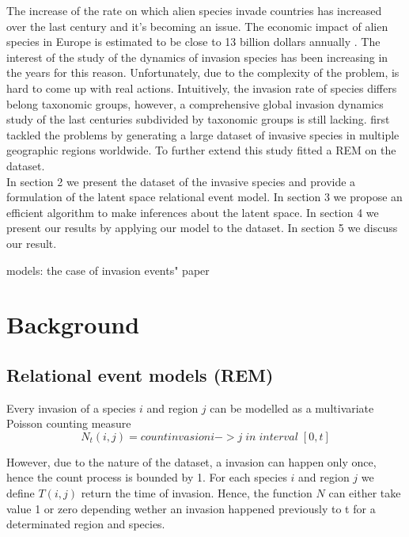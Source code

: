 \documentclass[mscthesis]{usiinfthesis}
\begin{document}
The increase of the rate on which alien species invade countries has increased over the last century and it's becoming an issue. The economic impact of alien species in Europe is estimated to be close to 13 billion dollars annually \citet{intro:rate}. The interest of the study of the dynamics of invasion species has been increasing in the years for this reason. Unfortunately, due to the complexity of the problem, is hard to come up with real actions. Intuitively, the invasion rate of species differs belong taxonomic groups, however, a comprehensive global invasion dynamics study of the last centuries subdivided by taxonomic groups is still lacking. \citet{intro:dataset} first tackled the problems by generating a large dataset of invasive species in multiple geographic regions worldwide. To further extend this study \citet{intro:ecological} fitted a REM on the dataset. \\

In section 2 we present the dataset of the invasive species and provide a formulation of the latent space relational event model. In section 3 we propose an efficient algorithm to make inferences about the latent space. In section 4 we present our results by applying our model to the dataset. In section 5 we discuss our result.

models: the case of invasion events" paper




\section{Background}
\subsection{Relational event models (REM)}


Every invasion of a species $i$ and region $j$ can be modelled as a multivariate Poisson counting measure $$N_t(i, j) = count{invasion i -> j \; in \; interval \; [0, t]}$$

However, due to the nature of the dataset, a invasion can happen only once, hence the count process is bounded by 1. For each species $i$ and region $j$ we define $T(i, j)$ return the time of invasion. Hence, the function $N$ can either take value 1 or zero depending wether an invasion happened previously to t for a determinated region and species.
\end{document}
